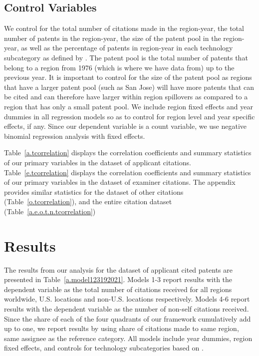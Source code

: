 \documentclass[12pt,letterpaper]{article}
\begin{document}
\subsection{Control Variables}
We control for the total number of citations made in the region-year, the total number of patents in the region-year, the size of the patent pool in the region-year, as well as the percentage of patents in region-year in each technology subcategory as defined by \cite*{Hall2001a}. The patent pool is the total number of patents that belong to a region from 1976 (which is where we have data from) up to the previous year. It is important to control for the size of the patent pool as  regions that have a larger patent pool (such as San Jose) will have more patents that can be cited and can therefore have larger within region spillovers as compared to a region that has only a small patent pool. We include region fixed effects and year dummies in all regression models so as to control for region level and year specific effects, if any. Since our dependent variable is a count variable, we use negative binomial regression analysis with fixed effects. \par

Table~\ref{a.tcorrelation} displays the correlation coefficients and summary statistics of our primary variables in the dataset of applicant  citations. Table~\ref{e.tcorrelation} displays the correlation coefficients and summary statistics of our primary variables in the dataset of examiner  citations. The appendix provides similar statistics for the dataset of other citations (Table~\ref{o.tcorrelation}), and the entire citation dataset (Table~\ref{a.e.o.t.n.tcorrelation})



\section{Results}
The  results from our analysis for the dataset of applicant  cited patents are presented in Table~\ref{a.model123192021}. Models 1-3 report results with the dependent variable as the total number of citations received for all regions worldwide, U.S. locations and non-U.S. locations respectively. Models 4-6 report results with the dependent variable as the number of non-self citations received. Since the share of each of the four quadrants of our framework cumulatively add up to one, we report results by using share of citations made to same region, same assignee as the reference category. All models include year dummies, region fixed effects, and controls for technology subcategories based on \cite*{Hall2001a}. \par
\end{document}
